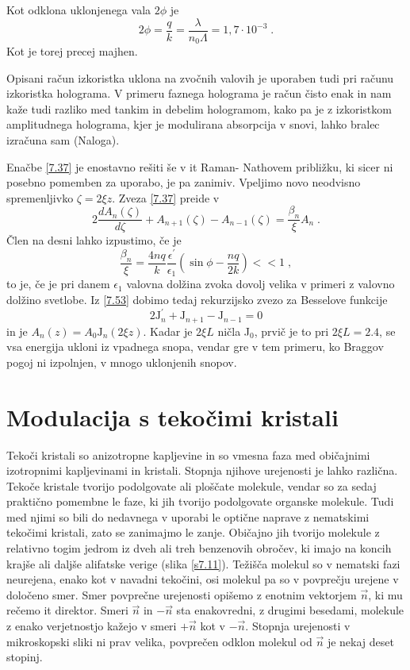 Kot odklona uklonjenega vala $2\phi$ je 
\begin{equation}
2\phi=\frac{q}{k}=\frac{\lambda}{n_{0}\Lambda}=1,7\cdot10^{-3}\;.\label{7.52}
\end{equation}
 Kot je torej precej majhen.

Opisani račun izkoristka uklona na zvočnih valovih je uporaben tudi
pri računu izkoristka holograma. V primeru faznega holograma je račun
čisto enak in nam kaže tudi razliko med tankim in debelim hologramom,
kako pa je z izkoristkom amplitudnega holograma, kjer je modulirana
absorpcija v snovi, lahko bralec izračuna sam (Naloga).

Enačbe \ref{7.37} je enostavno rešiti še v {it Raman- Nathovem približku},
ki sicer ni posebno pomemben za uporabo, je pa zanimiv. Vpeljimo novo
neodvisno spremenljivko $\zeta=2\xi z$. Zveza \ref{7.37} preide
v 
\begin{equation}
2\frac{dA_{n}(\zeta)}{d\zeta}+A_{n+1}(\zeta)-A_{n-1}(\zeta)=\frac{\beta_{n}}{\xi}A_{n}\;.\label{7.53}
\end{equation}
 Člen na desni lahko izpustimo, če je 
\begin{equation}
\frac{\beta_{n}}{\xi}=\frac{4nq}{k}\frac{\epsilon^{\prime}}{\epsilon_{1}}(\sin\phi-\frac{nq}{2k})<<1\;,\label{7.54}
\end{equation}
 to je, če je pri danem $\epsilon_{1}$ valovna dolžina zvoka dovolj
velika v primeri z valovno dolžino svetlobe. Iz \ref{7.53} dobimo
tedaj rekurzijsko zvezo za Besselove funkcije 
\begin{equation}
2\mbox{J}_{n}^{\prime}+\mbox{J}_{n+1}-\mbox{J}_{n-1}=0\label{7.55}
\end{equation}
 in je $A_{n}(z)=A_{0}\mbox{J}_{n}(2\xi z)$. Kadar je $2\xi L$ ničla
J$_{0}$, prvič je to pri $2\xi L=2.4$, se vsa energija ukloni iz
vpadnega snopa, vendar gre v tem primeru, ko Braggov pogoj ni izpolnjen,
v mnogo uklonjenih snopov.


\section{Modulacija s tekočimi kristali}

Tekoči kristali so anizotropne kapljevine in so vmesna faza med običajnimi
izotropnimi kapljevinami in kristali. Stopnja njihove urejenosti je
lahko različna. Tekoče kristale tvorijo podolgovate ali ploščate molekule,
vendar so za sedaj praktično pomembne le faze, ki jih tvorijo podolgovate
organske molekule. Tudi med njimi so bili do nedavnega v uporabi le
optične naprave z nematskimi tekočimi kristali, zato se zanimajmo
le zanje. Običajno jih tvorijo molekule z relativno togim jedrom iz
dveh ali treh benzenovih obročev, ki imajo na koncih krajše ali daljše
alifatske verige (slika \ref{s7.11}). Težišča molekul so v nematski
fazi neurejena, enako kot v navadni tekočini, osi molekul pa so v
povprečju urejene v določeno smer. Smer povprečne urejenosti opišemo
z enotnim vektorjem $\vec{n}$, ki mu rečemo {it direktor}. Smeri
$\vec{n}$ in $-\vec{n}$ sta enakovredni, z drugimi besedami, molekule
z enako verjetnostjo kažejo v smeri $+\vec{n}$ kot v $-\vec{n}$.
Stopnja urejenosti v mikroskopski sliki ni prav velika, povprečen
odklon molekul od $\vec{n}$ je nekaj deset stopinj.

